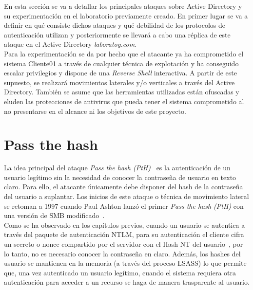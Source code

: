 En esta sección se va a detallar los principales ataques sobre Active Directory y su experimentación en el laboratorio previamente creado. En primer lugar se va a definir en qué consiste dichos ataques y qué debilidad de los protocolos de autenticación utilizan y posteriormente se llevará a cabo una réplica de este ataque en el Active Directory {\it laboratoy.com}. \\

Para la experimentación se da por hecho que el atacante ya ha comprometido el sistema Cliente01 a través de cualquier técnica de explotación y ha conseguido escalar privilegios y dispone de una {\it Reverse Shell} interactiva. A partir de este supuesto, se rea\-li\-za\-rá movimientos laterales y/o verticales a través del Active Directory. También se asume que las herramientas utilizadas están ofuscadas y eluden las protecciones de antivirus que pueda tener el sistema comprometido al no presentarse en el alcance ni los objetivos de este proyecto.

\section{Pass the hash}

La idea principal del ataque {\it Pass the hash (PtH)}~\cite{Capitulo5:PtHMitre} es la autenticación de un usuario legítimo sin la necesidad de conocer la contraseña de usuario en texto claro. Para ello, el atacante únicamente debe disponer del hash de la contraseña del usuario a suplantar. Los inicios de este ataque o técnica de movimiento lateral se retoman a 1997 cuando Paul Ashton lanzó el primer {\it Pass the hash (PtH)} con una versión de SMB modificado~\cite{Capitulo5:Paul}.\\

Como se ha observado en los capítulos previos, cuando un usuario se autentica a través del paquete de autenticación NTLM, para su autenticación el cliente cifra un secreto o nonce compartido por el servidor con el Hash NT del usuario~\cite{Capitulo5:HackingWindows}, por lo tanto, no es necesario conocer la contraseña en claro. Además, los hashes del usuario se mantienen en la memoria (a través del proceso LSASS) lo que permite que, una vez autenticado un usuario legítimo, cuando el sistema requiera otra autenticación para acceder a un recurso se haga de manera trasparente al usuario.\\ 

